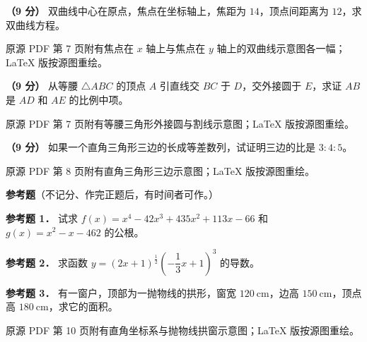 \begin{question}
\textbf{（9 分）} 双曲线中心在原点，焦点在坐标轴上，焦距为 $14$，顶点间距离为 $12$，求双曲线方程。

\begin{gktip}
原源 PDF 第 7 页附有焦点在 $x$ 轴上与焦点在 $y$ 轴上的双曲线示意图各一幅；LaTeX 版按源图重绘。
\end{gktip}
\nopagebreak[4]
\begin{center}\end{center}
\nopagebreak[4]
\nopagebreak[4]
\begin{center}\end{center}
\nopagebreak[4]
\Needspace{0.4\textheight}
\end{question}
\begin{question}
\textbf{（9 分）} 从等腰 $\triangle ABC$ 的顶点 $A$ 引直线交 $BC$ 于 $D$，交外接圆于 $E$，求证 $AB$ 是 $AD$ 和 $AE$ 的比例中项。

\begin{gktip}
原源 PDF 第 7 页附有等腰三角形外接圆与割线示意图；LaTeX 版按源图重绘。
\end{gktip}
\nopagebreak[4]
\begin{center}\end{center}
\nopagebreak[4]
\Needspace{0.4\textheight}
\end{question}
\begin{question}
\textbf{（9 分）} 如果一个直角三角形三边的长成等差数列，试证明三边的比是 $3:4:5$。

\begin{gktip}
原源 PDF 第 8 页附有直角三角形三边示意图；LaTeX 版按源图重绘。
\end{gktip}
\nopagebreak[4]
\begin{center}\end{center}
\nopagebreak[4]
\begin{gktip}
\textbf{参考题}（不记分、作完正题后，有时间者可作。）
\end{gktip}

\textbf{参考题 1．} 试求 $f(x)=x^4-42x^3+435x^2+113x-66$ 和 $g(x)=x^2-x-462$ 的公根。

\textbf{参考题 2．} 求函数 $y=\left(2x+1\right)^{\frac12}\left(-\dfrac13x+1\right)^3$ 的导数。

\textbf{参考题 3．} 有一窗户，顶部为一抛物线的拱形，窗宽 $120\ \mathrm{cm}$，边高 $150\ \mathrm{cm}$，顶点高 $180\ \mathrm{cm}$，求它的面积。

\begin{gktip}
原源 PDF 第 10 页附有直角坐标系与抛物线拱窗示意图；LaTeX 版按源图重绘。
\end{gktip}
\nopagebreak[4]
\begin{center}\end{center}
\nopagebreak[4]

\end{question}